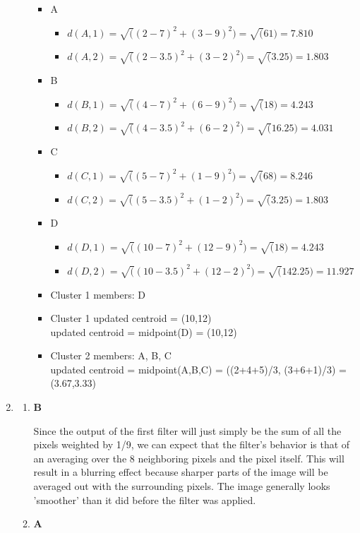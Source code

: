\documentclass[12pt]{article}
\begin{document}
\begin{enumerate}
\begin{enumerate}
\begin{itemize}
  \item A
    \begin{itemize}
      \item $d(A,1) = \sqrt((2-7)^2 + (3-9)^2) = \sqrt(61) = 7.810$
      \item $d(A,2) = \sqrt((2-3.5)^2 + (3-2)^2) = \sqrt(3.25) = 1.803$
    \end{itemize}
  
  \item B 
    \begin{itemize}
      \item $d(B,1) = \sqrt((4-7)^2 + (6-9)^2) = \sqrt(18) = 4.243$
      \item $d(B,2) = \sqrt((4-3.5)^2 + (6-2)^2) = \sqrt(16.25) = 4.031$
    \end{itemize}
  \item C
    \begin{itemize}
      \item $d(C,1) = \sqrt((5-7)^2 + (1-9)^2) = \sqrt(68) = 8.246$
      \item $d(C,2) = \sqrt((5-3.5)^2 + (1-2)^2) = \sqrt(3.25) = 1.803$
    \end{itemize}
  \item D
    \begin{itemize}
      \item $d(D,1) = \sqrt((10-7)^2 + (12-9)^2) = \sqrt(18) = 4.243$
      \item $d(D,2) = \sqrt((10-3.5)^2 + (12-2)^2) = \sqrt(142.25) = 11.927$
    \end{itemize}
  \item Cluster 1 members: D
  \item Cluster 1 updated centroid = (10,12) \\ 
    updated centroid = midpoint(D) = (10,12)
  \item Cluster 2 members: A, B, C \\ 
    updated centroid = midpoint(A,B,C) = ((2+4+5)/3, (3+6+1)/3) = (3.67,3.33)
  \end{itemize}
\end{enumerate}

\item
  \begin{enumerate}
  \item \textbf{B}
  
  Since the output of the first filter will just simply be the sum of all the pixels weighted by 1/9, we can expect that the filter's behavior is that of an averaging over the 8 neighboring pixels and the pixel itself. This will result in a blurring effect because
  sharper parts of the image will be averaged out with the surrounding pixels. The image generally looks 'smoother' than it did before the filter was applied.
  \item \textbf{A}
    

\end{enumerate}
\end{enumerate}
\end{document}
